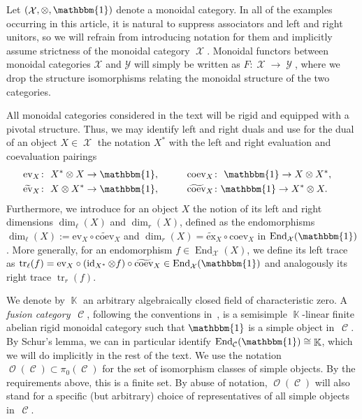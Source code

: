\documentclass[10pt,a4paper]{amsart}
\DeclareMathOperator{\id}{id}
\DeclareMathOperator{\End}{End}
\DeclareMathOperator{\tr}{tr}
\DeclareMathOperator{\K}{\mathbb{K}}
\DeclareMathOperator{\calc}{\mathcal{C}}
\DeclareMathOperator{\calo}{\mathcal{O}}
\DeclareMathOperator{\calx}{\mathcal{X}}
\DeclareMathOperator{\caly}{\mathcal{Y}}
\numberwithin{equation}{section}
\theoremstyle{definition}
\begin{document}
Let $(\calx, \otimes, \mathbbm{1})$ denote a monoidal category. In all of the examples occurring in this article, it is natural to suppress associators and left and right unitors, so we will refrain from introducing notation for them and implicitly assume strictness of the monoidal category $\calx$. Monoidal functors between monoidal categories $\mathcal{X}$ and $\mathcal{Y}$ will simply be written as $F\colon \calx \rightarrow \caly$, where we drop the structure isomorphisms relating the monoidal structure of the two categories.

All monoidal categories considered in the text will be rigid and equipped with a pivotal structure. Thus, we may identify left and right duals and use for the dual of an object $X \in \calx$ the notation $X^*$ with the left and right evaluation and coevaluation pairings
\begin{alignat*}{3}
 & \mathrm{ev}_X\colon \ X^* \otimes X \rightarrow \mathbbm{1}, \qquad && \mathrm{coev}_X\colon \ \mathbbm{1} \rightarrow X \otimes X^*, & \\
 & \widetilde{\mathrm{ev}}_X\colon \ X \otimes X^* \rightarrow \mathbbm{1}, \qquad && \widetilde{\mathrm{coev}}_X\colon \mathbbm{1} \rightarrow X^* \otimes X.&
\end{alignat*}
Furthermore, we introduce for an object $X$ the notion of its left and right dimensions $\dim_{\ell}(X)$ and $\dim_r(X)$, defined as the endomorphisms $\dim_{\ell}(X) := \mathrm{ev}_X \circ \widetilde{\mathrm{coev}}_X$ and $\dim_r(X) = \widetilde{\mathrm{ex}}_X \circ \mathrm{coev}_X$ in $\End_{\calx}(\mathbbm{1})$. More generally, for an endomorphism $f \in \End_{\calx}(X)$, we define its left trace as $\tr_{\ell}(f) = \mathrm{ev}_X \circ (\id_{X^*} \otimes f) \circ \widetilde{\mathrm{coev}}_X \in \End_{\calx}(\mathbbm{1})$ and analogously its right trace $\tr_r(f)$.

We denote by $\K$ an arbitrary algebraically closed field of characteristic zero. A \textit{fusion category}~$\calc$, following the conventions in~\cite{EGNO}, is a semisimple $\K$-linear finite abelian rigid monoidal category such that $\mathbbm{1}$ is a simple object in~$\calc$. By Schur's lemma, we can in particular identify $\End_{\calc}(\mathbbm{1}) \cong \K$, which we will do implicitly in the rest of the text. We use the notation $\calo(\calc) \subset \pi_0(\calc)$ for the set of isomorphism classes of simple objects. By the requirements above, this is a finite set. By abuse of notation, $\calo(\calc)$ will also stand for a specific (but arbitrary) choice of representatives of all simple objects in~$\calc$.
\end{document}
